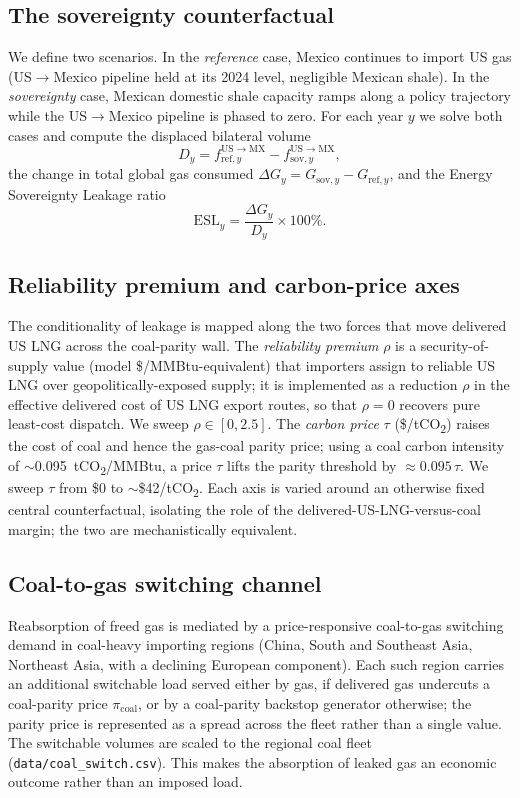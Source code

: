 \documentclass[sn-nature]{sn-jnl}
\theoremstyle{thmstyleone}%
\theoremstyle{thmstyletwo}%
\theoremstyle{thmstylethree}%
\begin{document}
\subsection*{The sovereignty counterfactual}
We define two scenarios. In the \emph{reference} case, Mexico continues to
import US gas (US$\rightarrow$Mexico pipeline held at its 2024 level,
negligible Mexican shale). In the \emph{sovereignty} case, Mexican domestic
shale capacity ramps along a policy trajectory while the US$\rightarrow$Mexico
pipeline is phased to zero. For each year $y$ we solve both cases and compute
the displaced bilateral volume
\begin{equation}
D_y = f^{\mathrm{US}\rightarrow\mathrm{MX}}_{\mathrm{ref},y}
    - f^{\mathrm{US}\rightarrow\mathrm{MX}}_{\mathrm{sov},y},
\end{equation}
the change in total global gas consumed
$\Delta G_y = G_{\mathrm{sov},y} - G_{\mathrm{ref},y}$, and the Energy
Sovereignty Leakage ratio
\begin{equation}
\mathrm{ESL}_y = \frac{\Delta G_y}{D_y}\times 100\%.
\end{equation}
\subsection*{Reliability premium and carbon-price axes}
The conditionality of leakage is mapped along the two forces that move
delivered US LNG across the coal-parity wall. The \emph{reliability premium}
$\rho$ is a security-of-supply value (model \$/MMBtu-equivalent) that importers
assign to reliable US LNG over geopolitically-exposed supply; it is implemented
as a reduction $\rho$ in the effective delivered cost of US LNG export routes,
so that $\rho=0$ recovers pure least-cost dispatch. We sweep
$\rho \in [0, 2.5]$. The \emph{carbon price} $\tau$ (\$/tCO\textsubscript{2})
raises the cost of coal and hence the gas-coal parity price; using a coal
carbon intensity of $\sim$0.095~tCO\textsubscript{2}/MMBtu, a price $\tau$
lifts the parity threshold by $\approx 0.095\,\tau$. We sweep $\tau$ from \$0
to $\sim$\$42/tCO\textsubscript{2}. Each axis is varied around an otherwise
fixed central counterfactual, isolating the role of the
delivered-US-LNG-versus-coal margin; the two are mechanistically equivalent.
\subsection*{Coal-to-gas switching channel}
Reabsorption of freed gas is mediated by a price-responsive coal-to-gas
switching demand in coal-heavy importing regions (China, South and Southeast
Asia, Northeast Asia, with a declining European component). Each such region
carries an additional switchable load served either by gas, if delivered gas
undercuts a coal-parity price $\pi_{\mathrm{coal}}$, or by a coal-parity
backstop generator otherwise; the parity price is represented as a spread
across the fleet rather than a single value. The switchable volumes are scaled
to the regional coal fleet (\texttt{data/coal\_switch.csv}). This makes the
absorption of leaked gas an economic outcome rather than an imposed load.
\end{document}
